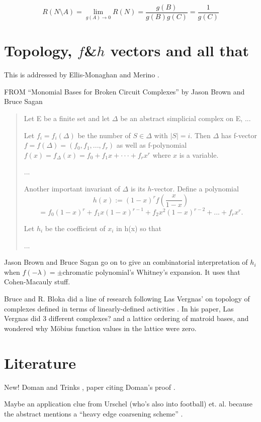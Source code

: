 \documentclass{article}
\begin{document}
\begin{enumerate}
\[
R(N\setminus A) = \lim_{g(A)\rightarrow 0}R(N) = \frac{g(B)}{g(B)g(C)} = \frac{1}{g(C)}
\]


\section{Topology, $f$\&$h$ vectors and all that}

This is addressed by Ellis-Monaghan and Merino
\cite{JEM-MerinoGraphPolyAppI}. 







FROM 
``Monomial Bases for Broken Circuit Complexes''
by Jason Brown and  Bruce Sagan
\cite{MonBasesBrkCircCompBrownSagan}
\begin{quote}
Let E be a finite set and let $\Delta$
be an abstract simplicial complex on E, ...

Let $f_i = f_i(\Delta)$ be the number of $S \in \Delta$ with
$|S| = i$. Then $\Delta$ has f-vector
$f = f(\Delta) = (f_0, f_1, . . . , f_r)$
as well as f-polynomial
$f(x) = f_{\Delta}(x) = f_0 + f_1x + · · · + f_rx^r$
where $x$ is a variable. 

...

Another important invariant of $\Delta$ is its $h$-vector. Define a polynomial
\[
h(x) := (1 - x)^r f(\frac{x}{1-x})
\]
\[
= f_0(1 - x)^r + f_1x(1 - x)^{r-1} + f_2x^2(1-x)^{r-2} + ... + f_rx^r. 
\]

Let $h_i$ be the coefficient of $x_i$ in h(x) so that 

...
\end{quote}

Jason Brown and  Bruce Sagan go on to give an combinatorial interpretation
of $h_i$ when $f(-\lambda)=\pm$chromatic polynomial's Whitney's expansion.
It uses that Cohen-Macauly stuff.

Bruce and R. Bloka did a line of research following Las Vergnas' 
\cite{ActOrdersMatrBasesLasVergnas} on 
topology of complexes defined in terms of linearly-defined activities
\cite{ActTopPropBlokaSagan}.  In his paper, 
Las Vergnas did 3 different complexes? 
and a lattice ordering of matroid bases, 
and wondered why M\"{o}bius function values in the lattice were zero.







\section{Literature}

New! Doman and Trinks \cite{DohmenTrinksAbsWitBrok}, paper citing
Doman's proof \cite{DohIndProofMatroids}.

Maybe an application clue from Urschel (who's also into football) et. al.
because the abstract mentions a ``heavy edge coarsening scheme''
\cite{UrschelFiedlerGraphLaplac}.

\end{enumerate}


\end{document}
